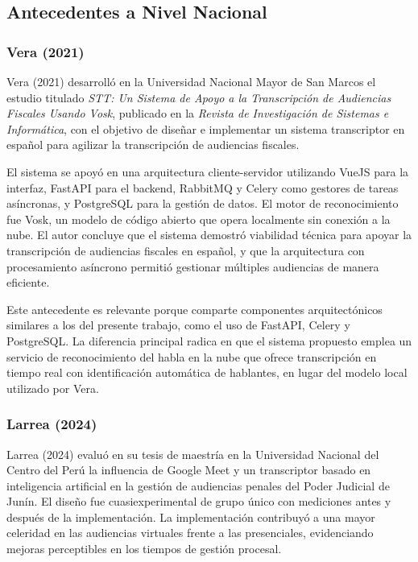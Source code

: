 \documentclass[12pt,a4paper,oneside]{article}
\begin{document}
\subsection{Antecedentes a Nivel Nacional}

\subsubsection{Vera (2021)}

Vera (2021) desarroll\'o en la Universidad Nacional Mayor de San Marcos el estudio titulado \textit{STT: Un Sistema de Apoyo a la Transcripci\'on de Audiencias Fiscales Usando Vosk}, publicado en la \textit{Revista de Investigaci\'on de Sistemas e Inform\'atica}, con el objetivo de dise\~nar e implementar un sistema transcriptor en espa\~nol para agilizar la transcripci\'on de audiencias fiscales.

El sistema se apoy\'o en una arquitectura cliente-servidor utilizando VueJS para la interfaz, FastAPI para el backend, RabbitMQ y Celery como gestores de tareas as\'incronas, y PostgreSQL para la gesti\'on de datos. El motor de reconocimiento fue Vosk, un modelo de c\'odigo abierto que opera localmente sin conexi\'on a la nube. El autor concluye que el sistema demostr\'o viabilidad t\'ecnica para apoyar la transcripci\'on de audiencias fiscales en espa\~nol, y que la arquitectura con procesamiento as\'incrono permiti\'o gestionar m\'ultiples audiencias de manera eficiente.

Este antecedente es relevante porque comparte componentes arquitect\'onicos similares a los del presente trabajo, como el uso de FastAPI, Celery y PostgreSQL. La diferencia principal radica en que el sistema propuesto emplea un servicio de reconocimiento del habla en la nube que ofrece transcripci\'on en tiempo real con identificaci\'on autom\'atica de hablantes, en lugar del modelo local utilizado por Vera.

\subsubsection{Larrea (2024)}

Larrea (2024) evalu\'o en su tesis de maestr\'ia en la Universidad Nacional del Centro del Per\'u la influencia de Google Meet y un transcriptor basado en inteligencia artificial en la gesti\'on de audiencias penales del Poder Judicial de Jun\'in. El dise\~no fue cuasiexperimental de grupo \'unico con mediciones antes y despu\'es de la implementaci\'on. La implementaci\'on contribuy\'o a una mayor celeridad en las audiencias virtuales frente a las presenciales, evidenciando mejoras perceptibles en los tiempos de gesti\'on procesal.
\end{document}
